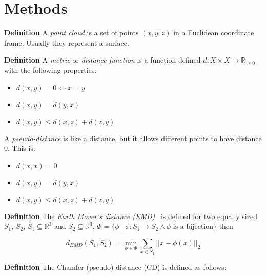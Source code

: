 \documentclass[12pt]{article}
\newcommand{\contentdescription}[1]{}
\begin{document}
    \section{Methods}
    \contentdescription{
        Methods (15-25\%): Describe the original paper's method to the extent that you would need to make your report and findings understandable. Otherwise, here you can describe other methods that you compare with or other methods that you apply on top of what you reimplemented. Here, you also try to justify any methodical modification or incremental changes that you have added to the original paper. It may be helpful to include figures, diagrams, or tables to describe your method or compare it with other methods.
    }

    \textbf{Definition} A \emph{point cloud} is a set of points $(x, y, z)$ in a Euclidean coordinate frame.
    Usually they represent a surface.

    \textbf{Definition} A \emph{metric} or \emph{distance function} is a function defined
    $d: X \times X \to \mathbb{R}_{\geq 0}$
    with the following properties:

    \begin{itemize}
        \item $d(x,y) = 0 \Leftrightarrow x = y$
        \item $d(x,y) = d(y,x)$
        \item $d(x,y) \leq d(x,z) + d(z,y)$
    \end{itemize}

    A \emph{pseudo-distance} is like a distance, but it allows different points to have distance 0. This is:
    \begin{itemize}
        \item $d(x,x) = 0$
        \item $d(x,y) = d(y,x)$
        \item $d(x,y) \leq d(x,z) + d(z,y)$
    \end{itemize}


    \textbf{Definition} The \emph{Earth Mover's distance (EMD)}~\cite{Rubner2000} is defined for two equally sized $S_{1}$, $S_{2}$, $S_{1} \subseteq \mathbb{R} ^{3}$ and $S_{2} \subseteq \mathbb{R} ^{3}$, $\Phi = \{ \phi \mid \phi: S_{1} \to S_{2} \land \phi \text{ is a bijection}\}$ then

    \[d_{EMD}(S_{1}, S_{2}) = \min _{\phi \in \Phi} \sum_{x\in S_{1}} || x - \phi(x)||_{2}\]

    \textbf{Definition} The Chamfer (pseudo)-distance (CD) is defined as follows:
\end{document}
